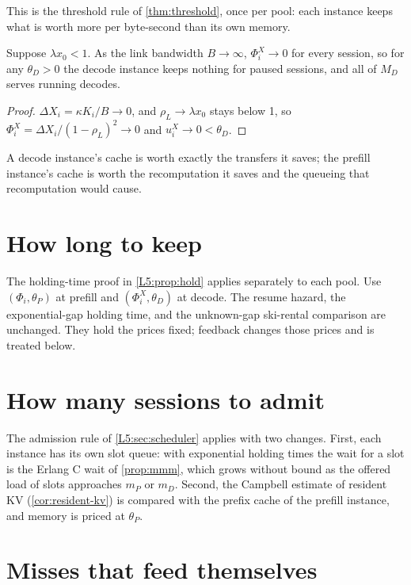 This is the threshold rule of \cref{thm:threshold}, once per pool: each instance keeps
what is worth more per byte-second than its own memory.

\begin{corollary}\label{L6:cor:free-transfer}
Suppose $\lambda x_0<1$. As the link bandwidth $B\to\infty$, $\Phi^X_i\to0$ for every session, so for any $\theta_D>0$ the decode
instance keeps nothing for paused sessions, and all of $M_D$ serves running decodes.
\end{corollary}

\begin{proof}
$\Delta X_i=\kappa K_i/B\to0$, and $\rho_L\to\lambda x_0$ stays below 1,
so $\Phi^X_i=\Delta X_i/(1-\rho_L)^2\to0$ and $u^X_i\to0<\theta_D$.
\end{proof}

A decode instance's cache is worth exactly the transfers it saves; the prefill
instance's cache is worth the recomputation it saves and the queueing that recomputation
would cause.

\section{How long to keep}\label{L6:sec:hold}
The holding-time proof in \cref{L5:prop:hold} applies separately to each pool.
Use $(\Phi_i,\theta_P)$ at prefill and $(\Phi^X_i,\theta_D)$ at decode.
The resume hazard, the exponential-gap holding time, and the unknown-gap
ski-rental comparison are unchanged. They hold the prices fixed; feedback
changes those prices and is treated below.

\section{How many sessions to admit}\label{L6:sec:admit}

The admission rule of \cref{L5:sec:scheduler} applies with two changes. First, each
instance has its own slot queue: with exponential holding times the wait for a slot is
the Erlang C wait of \cref{prop:mmm}, which grows without bound as the offered load of
slots approaches $m_P$ or $m_D$. Second, the Campbell estimate of resident KV
(\cref{cor:resident-kv}) is compared with the prefix cache of the prefill instance,
and memory is priced at $\theta_P$.

\section{Misses that feed themselves}\label{L6:sec:feedback}

